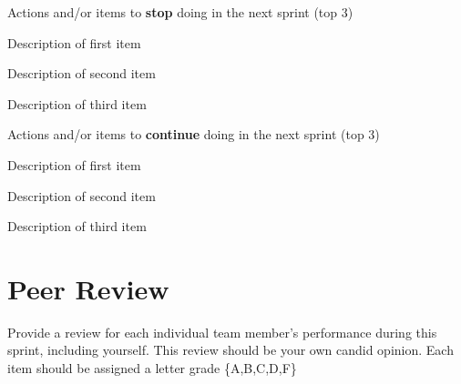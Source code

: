 \documentclass{article}
\begin{document}
Actions and/or items to \textbf{stop} doing in the next sprint (top 3)
\begin{itemize}
\begin{item}
Description of first item
\end{item}
\begin{item}
Description of second item
\end{item}
\begin{item}
Description of third item
\end{item}
\end{itemize}

Actions and/or items to \textbf{continue} doing in the next sprint (top 3)
\begin{itemize}
\begin{item}
Description of first item
\end{item}
\begin{item}
Description of second item
\end{item}
\begin{item}
Description of third item
\end{item}
\end{itemize}


\section{Peer Review}
Provide a review for each individual team member's performance during this sprint, including yourself. This review should be your own candid opinion. Each item should be assigned a letter grade \{A,B,C,D,F\} \\
\end{document}
